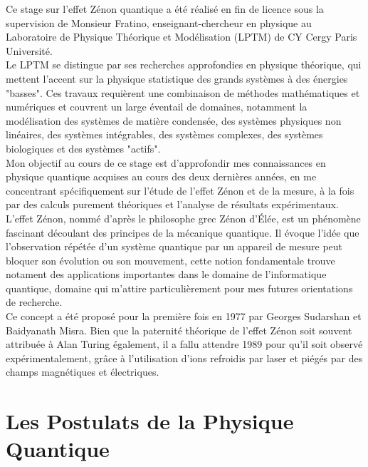 \documentclass[11pt]{article}
\begin{document}
\qquad Ce stage sur l'effet Zénon quantique a été réalisé en fin de licence sous la supervision de Monsieur Fratino, enseignant-chercheur en physique au Laboratoire de Physique Théorique et Modélisation (LPTM) de CY Cergy Paris Université. 
\\Le LPTM se distingue par ses recherches approfondies en physique théorique, qui mettent l'accent sur la physique statistique des grands systèmes à des énergies "basses". Ces travaux requièrent une combinaison de méthodes mathématiques et numériques et couvrent un large éventail de domaines, notamment la modélisation des systèmes de matière condensée, des systèmes physiques non linéaires, des systèmes intégrables, des systèmes complexes, des systèmes biologiques et des systèmes "actifs".\\
\vspace{0.5cm}
\qquad Mon objectif au cours de ce stage est d'approfondir mes connaissances en physique quantique acquises au cours des deux dernières années, en me concentrant spécifiquement sur l'étude de l'effet Zénon et de la mesure, à la fois par des calculs purement théoriques et l'analyse de résultats expérimentaux.\\
\vspace{0.5cm}
\qquad L'effet Zénon, nommé d'après le philosophe grec Zénon d'Élée, est un phénomène fascinant découlant des principes de la mécanique quantique. Il évoque l'idée que l'observation répétée d'un système quantique par un appareil de mesure peut bloquer son évolution ou son mouvement, cette notion fondamentale trouve notament des applications importantes dans le domaine de l'informatique quantique, domaine qui m'attire particulièrement pour mes futures orientations de recherche.\\
\vspace{0.5cm}
\qquad Ce concept a été proposé pour la première fois en 1977 par Georges Sudarshan et Baidyanath Misra. Bien que la paternité théorique de l'effet Zénon soit souvent attribuée à Alan Turing également, il a fallu attendre 1989 pour qu'il soit observé expérimentalement, grâce à l'utilisation d'ions refroidis par laser et piégés par des champs magnétiques et électriques.



\newpage

\section{Les Postulats de la Physique Quantique}
\end{document}
